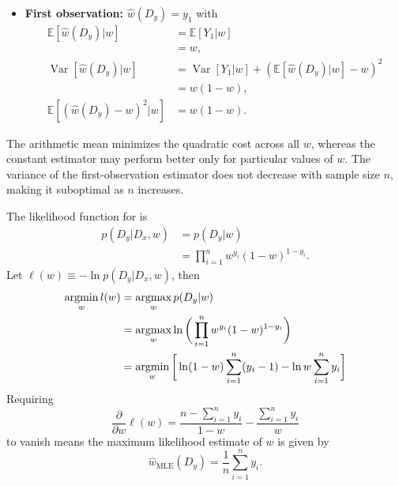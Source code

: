\begin{example}
\begin{itemize}
		\item \textbf{First observation:} 
		\(
		\hat{w}(D_y) = y_1
		\)
		with 
		\begin{equation} 
			\begin{split} 
				\mathbb{E}[\hat{w}(D_y)|w] &= \mathbb{E}[Y_1|w]\\ & = w,\\ \operatorname{Var}[\hat{w}(D_y)|w] &= \operatorname{Var}[Y_1|w] +(\mathbb{E}[\hat{w}(D_y)|w]-w)^2\\ &= w(1-w),\\ \mathbb{E}[(\hat{w}(D_y)-w)^2|w] &= w(1-w).
			\end{split} 
		\end{equation}
	\end{itemize}
	The arithmetic mean minimizes the quadratic cost across all $w$, whereas the constant estimator may perform better only for particular values of $w$. The variance of the first-observation estimator does not decrease with sample size $n$, making it suboptimal as $n$ increases.
\end{example}

\begin{example}
	\label{ex:bernoulli_mle}
	The likelihood function for  is
	\begin{equation} 
		\begin{split} 
			p(D_y|D_x,w) & =p(D_y|w)\\ & = \prod_{i=1}^nw^{y_i}(1-w)^{1-y_i}. 
		\end{split} 
	\end{equation} 
	Let $\ell(w)\equiv -\ln p(D_y|D_x,w)$, then 
	\begin{equation} 
		\begin{split} 
			\operatorname*{argmin}_wl(w) & = \operatorname*{argmax}_wp(D_y|w)\\ &= \operatorname*{argmax}_w\ln \bigg(\prod_{i=1}^nw^{y_i}(1-w)^{1-y_i}\bigg)\\ &=\operatorname*{argmin}_w \bigg[ \ln(1-w)\sum_{i=1}^n(y_i-1)-\ln w\sum_{i=1}^ny_i\bigg] 
		\end{split} 
	\end{equation}  
	Requiring
	\begin{equation} 
		\frac{\partial }{\partial w}\ell(w)=\frac{n-\sum_{i=1}^ny_i}{1-w}-\frac{\sum_{i=1}^ny_i}{w}
	\end{equation}
	 to vanish means the maximum likelihood estimate of $w$ is given by 
	\begin{equation} 
		\hat{w}_{\text{MLE}}(D_y)=\frac{1}{n}\sum_{i=1}^ny_i. 
	\end{equation} 
\end{example} 

